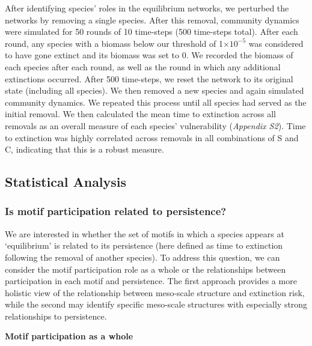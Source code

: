 \documentclass[12pt]{article}
\begin{document}
\begin{spacing}{2.0}
    		After identifying species' roles in the equilibrium networks, we perturbed the networks by removing a single species. After this removal, community dynamics were simulated for 50 rounds of 10 time-steps (500 time-steps total). After each round, any species with a biomass below our threshold of 1$\times10^{-5}$ was considered to have gone extinct and its biomass was set to 0. We recorded the biomass of each species after each round, as well as the round in which any additional extinctions occurred. After 500 time-steps, we reset the network to its original state (including all species). We then removed a new species and again simulated community dynamics. We repeated this process until all species had served as the initial removal.
    		We then calculated the mean time to extinction across all removals as an overall measure of each species' vulnerability (\emph{Appendix S2}). 
    		Time to extinction was highly correlated across removals in all combinations of S and C, indicating that this is a robust measure.


	\subsection*{Statistical Analysis}

        \subsubsection*{Is motif participation related to persistence?}

            We are interested in whether the set of motifs in which a species appears at `equilibrium' is related to its persistence (here defined as time to extinction following the removal of another species). 
            To address this question, we can consider the motif participation role as a whole or the relationships between participation in each motif and persistence. 
            The first approach provides a more holistic view of the relationship between meso-scale structure and extinction risk, while the second may identify specific meso-scale structures with especially strong relationships to persistence.


            \textbf{Motif participation as a whole}


\end{spacing}
\end{document}
